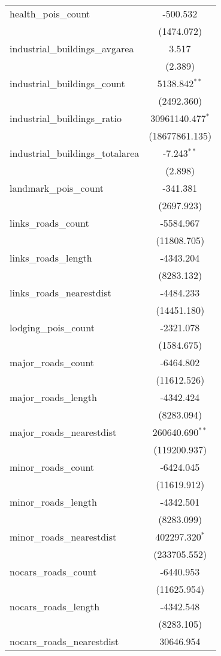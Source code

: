 \begin{table}[!htbp]
\begin{tabular}{@{\extracolsep{5pt}}lc}
 health_pois_count & -500.532$^{}$ \\
  & (1474.072) \\
 industrial_buildings_avgarea & 3.517$^{}$ \\
  & (2.389) \\
 industrial_buildings_count & 5138.842$^{**}$ \\
  & (2492.360) \\
 industrial_buildings_ratio & 30961140.477$^{*}$ \\
  & (18677861.135) \\
 industrial_buildings_totalarea & -7.243$^{**}$ \\
  & (2.898) \\
 landmark_pois_count & -341.381$^{}$ \\
  & (2697.923) \\
 links_roads_count & -5584.967$^{}$ \\
  & (11808.705) \\
 links_roads_length & -4343.204$^{}$ \\
  & (8283.132) \\
 links_roads_nearestdist & -4484.233$^{}$ \\
  & (14451.180) \\
 lodging_pois_count & -2321.078$^{}$ \\
  & (1584.675) \\
 major_roads_count & -6464.802$^{}$ \\
  & (11612.526) \\
 major_roads_length & -4342.424$^{}$ \\
  & (8283.094) \\
 major_roads_nearestdist & 260640.690$^{**}$ \\
  & (119200.937) \\
 minor_roads_count & -6424.045$^{}$ \\
  & (11619.912) \\
 minor_roads_length & -4342.501$^{}$ \\
  & (8283.099) \\
 minor_roads_nearestdist & 402297.320$^{*}$ \\
  & (233705.552) \\
 nocars_roads_count & -6440.953$^{}$ \\
  & (11625.954) \\
 nocars_roads_length & -4342.548$^{}$ \\
  & (8283.105) \\
 nocars_roads_nearestdist & 30646.954$^{}$ \\

\end{tabular}
\end{table}
